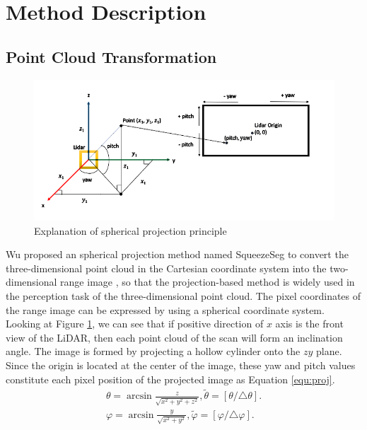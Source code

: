 \documentclass[final]{cvpr}
\begin{document}
\section{Method Description}
\subsection{Point Cloud Transformation}
\begin{figure}[t]
\begin{center}
   \includegraphics[width=1\linewidth]{proj.png}
\end{center}
   \caption{Explanation of spherical projection principle}
\label{fig:proj}
\end{figure}
Wu proposed an spherical projection method named SqueezeSeg\cite{4} to convert the three-dimensional point cloud in the Cartesian coordinate system into the two-dimensional range image , so that the projection-based method is widely used in the perception task of the three-dimensional point cloud. The pixel coordinates of the range image can be expressed by using a spherical coordinate system. Looking at Figure \ref{fig:proj}, we can see that if positive direction of $x$ axis is the front view of the LiDAR, then each point cloud of the scan will form an inclination angle. The image is formed by projecting a hollow cylinder onto the $zy$ plane. Since the origin is located at the center of the image, these yaw and pitch values constitute each pixel position of the projected image as Equation \ref{equ:proj}. 
\begin{equation}\label{equ:proj}
 \begin{split}
   \theta =\arcsin \frac{z}{\sqrt{x^2+y^2+z^2}}, \tilde{\theta}=[\theta / \triangle \theta ].\\
\varphi =\arcsin \frac{y}{\sqrt{x^2+y^2}}, \tilde{\varphi}=[\varphi / \triangle \varphi ].
  \end{split}
\end{equation}
\end{document}
